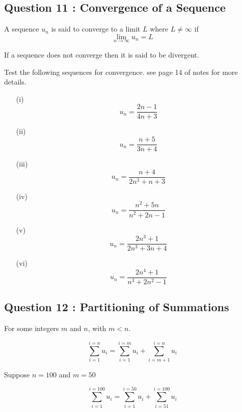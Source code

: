 \documentclass[]{article}
\begin{document}
\subsection*{Question 11 : Convergence of a Sequence}

\begin{framed}
	A sequence $u_n$
	is said to converge to a limit $L$ where $L \neq \infty$ if
	\[ \lim_{n \to \infty } u_n = L \]
	
	
	
	
	If a sequence does not converge then it is said to be divergent. \end{framed}
%
Test the following sequences for convergence. see page 14 of notes for more details.
\begin{multicols}{2}
	\begin{itemize}
		\item[(i)] \[u_n = \frac{2n-1}{4n+3}\]
		
		\item[(ii)] \[u_n = \frac{n+5}{3n+4}\]
		
		\item[(iii)] \[u_n = \frac{n+4}{2n^3 + n +3}\]
		
		\item[(iv)] \[u_n = \frac{n^2 +5n }{n^2 + 2n -1}\]
		
		\item[(v)] \[u_n = \frac{2n^3+1}{2n^3 +3n +4 } \]
		
		\item[(vi)]\[u_n =  \frac{2n^4+1}{n^3 +2n^2 -1 } \]
		
	\end{itemize}	
\end{multicols}


\subsection*{Question 12 : Partitioning of Summations}
\begin{framed}
	
	For some integers $m$ and $n$, with $m<n$.
	
	\[ \sum^{i=n}_{i=1} u_{i} = \sum^{i=m}_{i=1} u_{i} + \sum^{i=n}_{i=m+1} u_{i}\]
	
	Suppose $n=100$ and $m=50$
	
	\[ \sum^{i=100}_{i=1} u_{i} = \sum^{i=50}_{i=1} u_{i} + \sum^{i=100}_{i=51} u_{i}\]
	
\end{framed}
\newpage
\end{document}
